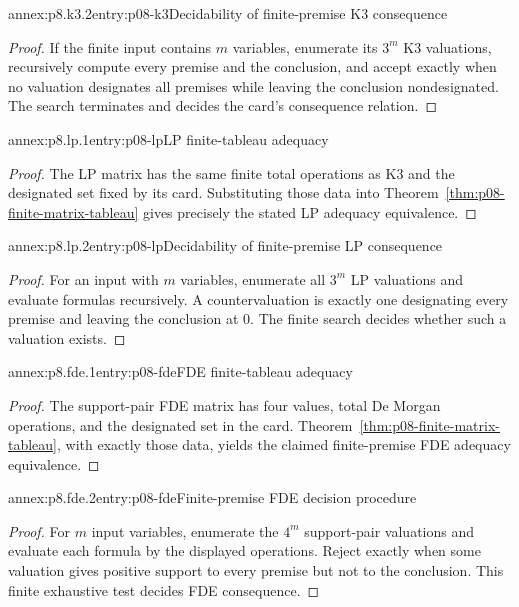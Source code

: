 \begin{annexitem}{annex:p8.k3.2}{entry:p08-k3}{Decidability of finite-premise K3 consequence}
\begin{proof}
If the finite input contains \(m\) variables, enumerate its \(3^m\) K3
valuations, recursively compute every premise and the conclusion, and accept
exactly when no valuation designates all premises while leaving the conclusion
nondesignated.  The search terminates and decides the card's consequence
relation.
\end{proof}
\end{annexitem}

\begin{annexitem}{annex:p8.lp.1}{entry:p08-lp}{LP finite-tableau adequacy}
\begin{proof}
The LP matrix has the same finite total operations as K3 and the designated set
fixed by its card.  Substituting those data into
Theorem~\ref{thm:p08-finite-matrix-tableau} gives precisely the stated LP
adequacy equivalence.
\end{proof}
\end{annexitem}

\begin{annexitem}{annex:p8.lp.2}{entry:p08-lp}{Decidability of finite-premise LP consequence}
\begin{proof}
For an input with \(m\) variables, enumerate all \(3^m\) LP valuations and
evaluate formulas recursively.  A countervaluation is exactly one designating
every premise and leaving the conclusion at \(0\).  The finite search decides
whether such a valuation exists.
\end{proof}
\end{annexitem}

\begin{annexitem}{annex:p8.fde.1}{entry:p08-fde}{FDE finite-tableau adequacy}
\begin{proof}
The support-pair FDE matrix has four values, total De Morgan operations, and the
designated set in the card.  Theorem~\ref{thm:p08-finite-matrix-tableau}, with
exactly those data, yields the claimed finite-premise FDE adequacy equivalence.
\end{proof}
\end{annexitem}

\begin{annexitem}{annex:p8.fde.2}{entry:p08-fde}{Finite-premise FDE decision procedure}
\begin{proof}
For \(m\) input variables, enumerate the \(4^m\) support-pair valuations and
evaluate each formula by the displayed operations.  Reject exactly when some
valuation gives positive support to every premise but not to the conclusion.
This finite exhaustive test decides FDE consequence.
\end{proof}
\end{annexitem}

